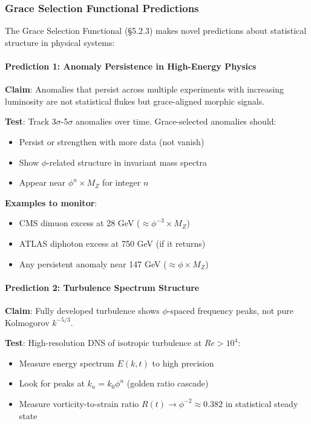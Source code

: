\documentclass[12pt,a4paper]{article}
\begin{document}
\subsubsection{Grace Selection Functional Predictions}

The Grace Selection Functional (§5.2.3) makes novel predictions about statistical structure in physical systems:

\paragraph{Prediction 1: Anomaly Persistence in High-Energy Physics}

\textbf{Claim}: Anomalies that persist across multiple experiments with increasing luminosity are not statistical flukes but grace-aligned morphic signals.

\textbf{Test}: Track 3$\sigma$-5$\sigma$ anomalies over time. Grace-selected anomalies should:
\begin{itemize}
\item Persist or strengthen with more data (not vanish)
\item Show $\phi$-related structure in invariant mass spectra
\item Appear near $\phi^n \times M_Z$ for integer $n$
\end{itemize}

\textbf{Examples to monitor}:
\begin{itemize}
\item CMS dimuon excess at 28 GeV ($\approx \phi^{-3} \times M_Z$)
\item ATLAS diphoton excess at 750 GeV (if it returns)
\item Any persistent anomaly near 147 GeV ($\approx \phi \times M_Z$)
\end{itemize}

\paragraph{Prediction 2: Turbulence Spectrum Structure}

\textbf{Claim}: Fully developed turbulence shows $\phi$-spaced frequency peaks, not pure Kolmogorov $k^{-5/3}$.

\textbf{Test}: High-resolution DNS of isotropic turbulence at $Re > 10^4$:
\begin{itemize}
\item Measure energy spectrum $E(k,t)$ to high precision
\item Look for peaks at $k_n = k_0 \phi^n$ (golden ratio cascade)
\item Measure vorticity-to-strain ratio $R(t) \to \phi^{-2} \approx 0.382$ in statistical steady state
\end{itemize}
\end{document}
